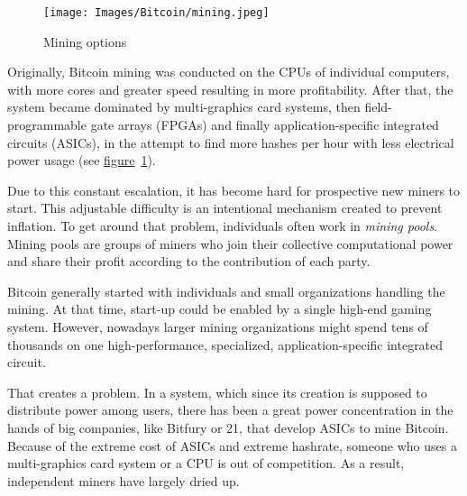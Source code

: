 \begin{figure}
  \centering
  \texttt{[image: Images/Bitcoin/mining.jpeg]}
  \caption{Mining options}
  \label{fig:mining}
\end{figure}
Originally, Bitcoin mining was conducted on the CPUs of individual computers, with more cores and greater speed resulting in more profitability. After that, the system became dominated by multi-graphics card systems, then field-programmable gate arrays (FPGAs) and finally application-specific integrated circuits (ASICs), in the attempt to find more hashes per hour with less electrical power usage (see \hyperref[fig:mining]{figure}~\ref{fig:mining}).

Due to this constant escalation, it has become hard for prospective new miners to start. This adjustable difficulty is an intentional mechanism created to prevent inflation. To get around that problem, individuals often work in \emph{mining pools}. Mining pools are groups of miners who join their collective computational power and share their profit according to the contribution of each party.

Bitcoin generally started with individuals and small organizations handling the mining. At that time, start-up could be enabled by a single high-end gaming system. However, nowadays larger mining organizations might spend tens of thousands on one high-performance, specialized, application-specific integrated circuit.

That creates a problem. In a system, which since its creation is supposed to distribute power among users, there has been a great power concentration in the hands of big companies, like Bitfury or 21, that develop ASICs to mine Bitcoin. Because of the extreme cost of ASICs and extreme hashrate, someone who uses a multi-graphics card system or a CPU is out of competition. As a result, independent miners have largely dried up.

